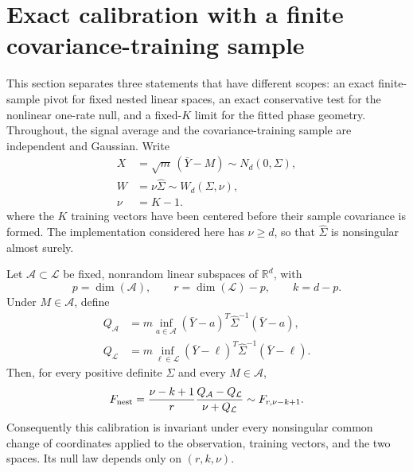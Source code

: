 \section{Exact calibration with a finite covariance-training sample}
\label{sec:finite-training}

This section separates three statements that have different scopes: an exact
finite-sample pivot for fixed nested linear spaces, an exact conservative
test for the nonlinear one-rate null, and a fixed-$K$ limit for the fitted
phase geometry.  Throughout, the signal average and the covariance-training
sample are independent and Gaussian.  Write
\begin{align*}
X&=\sqrt m\,(\bar Y-M)\sim N_d(0,\Sigma),\\
W&=\nu\widehat\Sigma\sim W_d(\Sigma,\nu),\\
\nu&=K-1.
\end{align*}
where the $K$ training vectors have been centered before their sample
covariance is formed.  The implementation considered here has
$\nu\ge d$, so that $\widehat\Sigma$ is nonsingular almost surely.

\begin{theorem}
\label{thm:finite-training-pivot}
Let $\mathcal A\subset\mathcal L$ be fixed, nonrandom linear subspaces of
$\mathbb R^d$, with
\[
 p=\dim(\mathcal A),\qquad r=\dim(\mathcal L)-p,
 \qquad k=d-p.
\]
Under $M\in\mathcal A$, define
\begin{align*}
Q_{\mathcal A}&=m\inf_{a\in\mathcal A}
 (\bar Y-a)^T\widehat\Sigma^{-1}(\bar Y-a),\\
Q_{\mathcal L}&=m\inf_{\ell\in\mathcal L}
 (\bar Y-\ell)^T\widehat\Sigma^{-1}(\bar Y-\ell).
\end{align*}
Then, for every positive definite $\Sigma$ and every $M\in\mathcal A$,
\[
 F_{\rm nest}={\nu-k+1\over r}
 {Q_{\mathcal A}-Q_{\mathcal L}\over \nu+Q_{\mathcal L}}
 \sim F_{r,\nu-k+1}.
\]
Consequently this calibration is invariant under every nonsingular common
change of coordinates applied to the observation, training vectors, and the
two spaces.  Its null law depends only on $(r,k,\nu)$.
\end{theorem}

